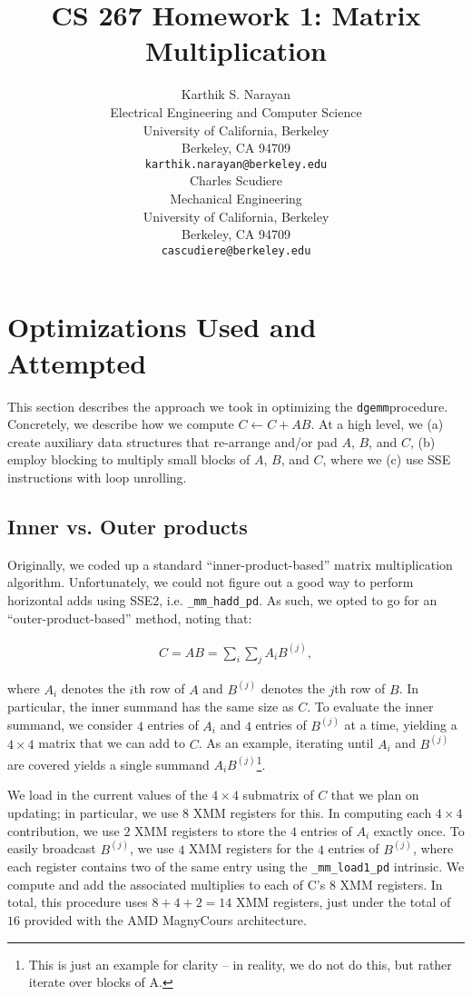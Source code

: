 \documentclass{article} %
\title{CS 267 Homework 1: Matrix Multiplication}
\author{
Karthik S. Narayan \\
Electrical Engineering and Computer Science\\
University of California, Berkeley\\
Berkeley, CA 94709 \\
\texttt{karthik.narayan@berkeley.edu} \\
\And
Charles Scudiere \\
Mechanical Engineering\\
University of California, Berkeley\\
Berkeley, CA 94709 \\
\texttt{cascudiere@berkeley.edu} \\
}
\begin{document}
\newcommand{\dgemm}{\texttt{dgemm}}

\newcommand\todo{\textcolor{red}{TODO}}
\newcommand\tocite{\textcolor{red}{CITE}}

\maketitle

\section{Optimizations Used and Attempted}
This section describes the approach we took in optimizing the \dgemm procedure.
Concretely, we describe how we compute $C \leftarrow C + AB$. At a high level,
we (a) create auxiliary data structures that re-arrange and/or pad $A$, $B$,
and $C$, (b) employ blocking to multiply small blocks of $A$, $B$, and $C$,
where we (c) use SSE instructions with loop unrolling.

\subsection{Inner vs. Outer products}
\label{sec:ioproducts}
Originally, we coded up a standard ``inner-product-based'' matrix multiplication
algorithm. Unfortunately, we could not figure out a good way to perform
horizontal adds using SSE2, i.e. \texttt{\_mm\_hadd\_pd}. As such, we opted to go
for an ``outer-product-based'' method, noting that:

\begin{align}
  \label{eq:matmul}
  C = AB = \sum_{i}\sum_{j}A_i B^{(j)},
\end{align}

where $A_i$ denotes the $i$th row of $A$ and $B^{(j)}$ denotes the $j$th row of
$B$. In particular, the inner summand has the same size as $C$. To evaluate the
inner summand, we consider $4$ entries of $A_i$ and $4$ entries of $B^{(j)}$ at
a time, yielding a $4\times 4$ matrix that we can add to $C$. As an example,
iterating until $A_i$ and $B^{(j)}$ are covered yields a single summand
$A_i B^{(j)}$\footnote{This is just an example for clarity -- in reality, we do
  not do this, but rather iterate over blocks of A.}.

We load in the current values of the $4\times 4$ submatrix of $C$ that we
plan on updating; in particular, we use $8$ XMM registers for this.
In computing each $4\times 4$ contribution, we use $2$ XMM registers to store
the $4$ entries of $A_i$ exactly once. To easily broadcast $B^{(j)}$, we use
$4$ XMM registers for the $4$ entries of $B^{(j)}$, where each register contains
two of the same entry using the \texttt{\_mm\_load1\_pd} intrinsic. We compute
and add the associated multiplies to each of C's $8$ XMM registers. In total,
this procedure uses $8 + 4 + 2 = 14$ XMM registers, just under the total of $16$
provided with the AMD MagnyCours architecture.
\end{document}
